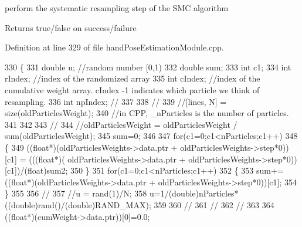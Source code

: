 perform the systematic resampling step of the S\+MC algorithm 

\begin{DoxyReturn}{Returns}
true/false on success/failure 
\end{DoxyReturn}


Definition at line 329 of file hand\+Pose\+Estimation\+Module.\+cpp.


\begin{DoxyCode}
330 \{
331     \textcolor{keywordtype}{double} u; \textcolor{comment}{//random number [0,1)}
332     \textcolor{keywordtype}{double} sum;
333     \textcolor{keywordtype}{int} c1;
334     \textcolor{keywordtype}{int} rIndex;  \textcolor{comment}{//index of the randomized array}
335     \textcolor{keywordtype}{int} cIndex;  \textcolor{comment}{//index of the cumulative weight array. cIndex -1 indicates which particle we think of
       resampling.}
336     \textcolor{keywordtype}{int} npIndex; \textcolor{comment}{//%
337 
338     \textcolor{comment}{//%
339     \textcolor{comment}{//[lines, N] = size(oldParticlesWeight);}
340     \textcolor{comment}{//in CPP, \_nParticles is the number of particles.}
341 
342 
343     \textcolor{comment}{//%
344     \textcolor{comment}{//oldParticlesWeight = oldParticlesWeight / sum(oldParticlesWeight);}
345     sum=0;
346 
347     \textcolor{keywordflow}{for}(c1=0;c1<nParticles;c1++) 
348     \{
349         ((\textcolor{keywordtype}{float}*)(oldParticlesWeights->data.ptr + oldParticlesWeights->step*0))[c1] = (((\textcolor{keywordtype}{float}*)(
      oldParticlesWeights->data.ptr + oldParticlesWeights->step*0))[c1])/(\textcolor{keywordtype}{float})sum2;
350     \}
351     \textcolor{keywordflow}{for}(c1=0;c1<nParticles;c1++) 
352     \{
353         sum+=((\textcolor{keywordtype}{float}*)(oldParticlesWeights->data.ptr + oldParticlesWeights->step*0))[c1];
354     \}
355 
356     \textcolor{comment}{//%
357     \textcolor{comment}{//u = rand(1)/N; %
358     u=1/(double)nParticles*((\textcolor{keywordtype}{double})rand()/(double)RAND\_MAX);
359 
360     \textcolor{comment}{//%
361     \textcolor{comment}{//%
362     \textcolor{comment}{//%
363 
364     ((\textcolor{keywordtype}{float}*)(cumWeight->data.ptr))[0]=0.0;
}}}}}}}}
\end{DoxyCode}
